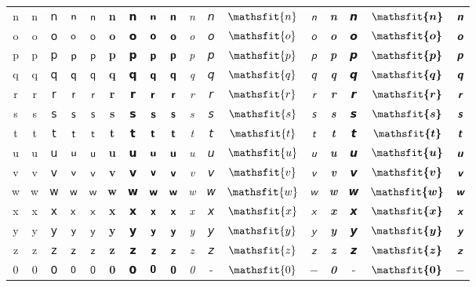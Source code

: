 \documentclass{standalone}
\newcommand{\SANS}[1]{\ifmmode\mathsf{#1}\else\textsf{#1}\fi}
\newcommand{\BSANS}[1]{\ifmmode\boldsymbol{\mathsf{#1}}\else\textbf{\textsf{#1}}\fi}
\newcommand{\ISANS}[1]{\ifmmode\mathsfit{#1}\else\textit{\textsf{#1}}\fi}
\newcommand{\BISANS}[1]{\ifmmode\bm{\mathsfit{#1}}\else\textbf{\textsf{\textit{#1}}}\fi}
\begin{document}
\begin{tabular}{c|cc|cc|cc|cc|cc|cc|cc|cc}
n & \SANS{n} & 𝗇 & $\SANS{n}$ & $𝗇$ & \BSANS{n} & 𝗻 & $\BSANS{n}$ & $𝗻$ & \ISANS{n} & 𝘯 & $\ISANS{n}$ & $𝘯$ & \BISANS{n} & 𝙣 & $\BISANS{n}$ & $𝙣$ \\
o & \SANS{o} & 𝗈 & $\SANS{o}$ & $𝗈$ & \BSANS{o} & 𝗼 & $\BSANS{o}$ & $𝗼$ & \ISANS{o} & 𝘰 & $\ISANS{o}$ & $𝘰$ & \BISANS{o} & 𝙤 & $\BISANS{o}$ & $𝙤$ \\
p & \SANS{p} & 𝗉 & $\SANS{p}$ & $𝗉$ & \BSANS{p} & 𝗽 & $\BSANS{p}$ & $𝗽$ & \ISANS{p} & 𝘱 & $\ISANS{p}$ & $𝘱$ & \BISANS{p} & 𝙥 & $\BISANS{p}$ & $𝙥$ \\
q & \SANS{q} & 𝗊 & $\SANS{q}$ & $𝗊$ & \BSANS{q} & 𝗾 & $\BSANS{q}$ & $𝗾$ & \ISANS{q} & 𝘲 & $\ISANS{q}$ & $𝘲$ & \BISANS{q} & 𝙦 & $\BISANS{q}$ & $𝙦$ \\
r & \SANS{r} & 𝗋 & $\SANS{r}$ & $𝗋$ & \BSANS{r} & 𝗿 & $\BSANS{r}$ & $𝗿$ & \ISANS{r} & 𝘳 & $\ISANS{r}$ & $𝘳$ & \BISANS{r} & 𝙧 & $\BISANS{r}$ & $𝙧$ \\
s & \SANS{s} & 𝗌 & $\SANS{s}$ & $𝗌$ & \BSANS{s} & 𝘀 & $\BSANS{s}$ & $𝘀$ & \ISANS{s} & 𝘴 & $\ISANS{s}$ & $𝘴$ & \BISANS{s} & 𝙨 & $\BISANS{s}$ & $𝙨$ \\
t & \SANS{t} & 𝗍 & $\SANS{t}$ & $𝗍$ & \BSANS{t} & 𝘁 & $\BSANS{t}$ & $𝘁$ & \ISANS{t} & 𝘵 & $\ISANS{t}$ & $𝘵$ & \BISANS{t} & 𝙩 & $\BISANS{t}$ & $𝙩$ \\
u & \SANS{u} & 𝗎 & $\SANS{u}$ & $𝗎$ & \BSANS{u} & 𝘂 & $\BSANS{u}$ & $𝘂$ & \ISANS{u} & 𝘶 & $\ISANS{u}$ & $𝘶$ & \BISANS{u} & 𝙪 & $\BISANS{u}$ & $𝙪$ \\
v & \SANS{v} & 𝗏 & $\SANS{v}$ & $𝗏$ & \BSANS{v} & 𝘃 & $\BSANS{v}$ & $𝘃$ & \ISANS{v} & 𝘷 & $\ISANS{v}$ & $𝘷$ & \BISANS{v} & 𝙫 & $\BISANS{v}$ & $𝙫$ \\
w & \SANS{w} & 𝗐 & $\SANS{w}$ & $𝗐$ & \BSANS{w} & 𝘄 & $\BSANS{w}$ & $𝘄$ & \ISANS{w} & 𝘸 & $\ISANS{w}$ & $𝘸$ & \BISANS{w} & 𝙬 & $\BISANS{w}$ & $𝙬$ \\
x & \SANS{x} & 𝗑 & $\SANS{x}$ & $𝗑$ & \BSANS{x} & 𝘅 & $\BSANS{x}$ & $𝘅$ & \ISANS{x} & 𝘹 & $\ISANS{x}$ & $𝘹$ & \BISANS{x} & 𝙭 & $\BISANS{x}$ & $𝙭$ \\
y & \SANS{y} & 𝗒 & $\SANS{y}$ & $𝗒$ & \BSANS{y} & 𝘆 & $\BSANS{y}$ & $𝘆$ & \ISANS{y} & 𝘺 & $\ISANS{y}$ & $𝘺$ & \BISANS{y} & 𝙮 & $\BISANS{y}$ & $𝙮$ \\
z & \SANS{z} & 𝗓 & $\SANS{z}$ & $𝗓$ & \BSANS{z} & 𝘇 & $\BSANS{z}$ & $𝘇$ & \ISANS{z} & 𝘻 & $\ISANS{z}$ & $𝘻$ & \BISANS{z} & 𝙯 & $\BISANS{z}$ & $𝙯$ \\
\midrule
0 & \SANS{0} & 𝟢 & $\SANS{0}$ & $𝟢$ & \BSANS{0} & 𝟬 & $\BSANS{0}$ & $𝟬$ & \ISANS{0} & - & $\ISANS{0}$ & $-$ & \BISANS{0} & - & $\BISANS{0}$ & $-$ \\

\end{tabular}
\end{document}
